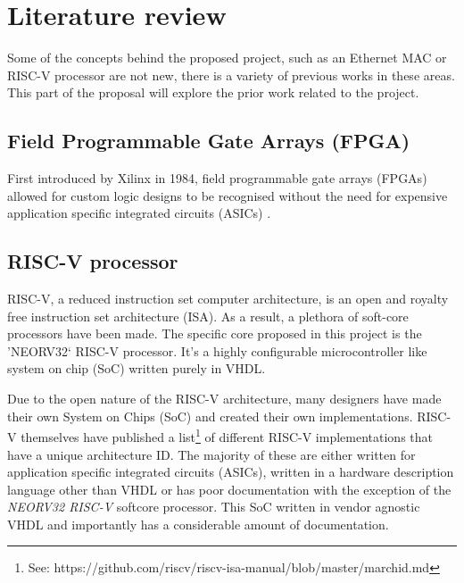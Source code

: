 
\chapter[Literature review]{Literature review }
\label{Chap:label}	%
\pagestyle{headings}



Some of the concepts behind the proposed project, such as an Ethernet MAC or RISC-V processor are not new, there is a variety of previous works in these areas. This part of the proposal will explore the prior work related to the project. 


\section{Field Programmable Gate Arrays (FPGA)}
First introduced by Xilinx in 1984, field programmable gate arrays (FPGAs) allowed for custom logic designs to be recognised without the need for 
expensive application specific integrated circuits (ASICs) \cite{30YearsOfFPGA}.




\section{RISC-V processor}
RISC-V, a reduced instruction set computer architecture, is an open and royalty free instruction set architecture (ISA). As a result, a plethora 
of soft-core processors have been made. The specific core proposed in this project is the 'NEORV32` RISC-V processor. It's a highly configurable 
microcontroller like system on chip (SoC) written purely in VHDL.


Due to the open nature of the RISC-V architecture, many designers have made their own System on Chips (SoC) and created their own implementations. RISC-V 
themselves have published a list\footnote[1]{See: https://github.com/riscv/riscv-isa-manual/blob/master/marchid.md} of different RISC-V implementations 
that have a unique architecture ID. The majority of these are either written for application specific integrated circuits (ASICs), written in a hardware 
description language other than VHDL or has poor documentation with the exception of the  \textit{NEORV32 RISC-V} softcore processor. This SoC written 
in vendor agnostic VHDL and importantly has a considerable amount of documentation. 

